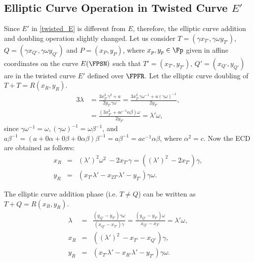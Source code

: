 \subsection{Elliptic Curve Operation in Twisted Curve $E'$}
 Since $E'$ in \eqref{twisted_E} is different from $E$, therefore, the elliptic curve addition and doubling operation slightly changed.
Let us consider  $T=(\gamma x_{T'},\gamma \omega y_{T'})$, $Q=(\gamma x_{Q'}, \gamma \omega y_{Q'})$  and  $P=(x_P,y_P) $, where $x_p, y_p \in \Fp$ given in affine coordinates on the curve $E(\FPSN)$ such that $T'=(x_{T'},y_{T'})$, $Q'=(x_{Q'},y_{Q'})$ are in the twisted curve $E'$ defined over $\FPFR$.
Let the elliptic curve doubling of $T+T = R(x_R, y_R)$. 
\begin{alignat}{3}
 \lambda & =  \frac{ 3x_{T'}^2 \gamma^2+a}{2 y_{T'} \gamma \omega} = \frac{ 3x_{T'}^2 \gamma \omega^{-1}+a (\gamma \omega)^{-1} }{2 y_{T'}}, \nonumber \\
 & = \frac{ (3x_{T'}^2 +a c^{-1} \alpha\beta)\omega}{2 y_{T'}} = \lambda' \omega, \nonumber 
 \end{alignat}
since  $\gamma \omega^{-1} = \omega, (\gamma \omega)^{-1} = \omega \beta^{-1}$, and $a \beta^{-1} = (a + 0\alpha + 0 \beta + 0 \alpha \beta) \beta ^{-1}=a \beta^{-1} = ac^{-1} \alpha \beta$, where $\alpha^2=c$.
Now the ECD are obtained as follows:
\begin{eqnarray}
 x_R &=& (\lambda')^2 \omega^2 \ - 2x_{T'}\gamma   = ((\lambda')^2  \ - 2x_{T'})\gamma, \nonumber \\
 y_R &=& (x_{T'}\lambda' -x_{2T'}\lambda'-y_{T'})\gamma \omega \nonumber.
\end{eqnarray}

The elliptic curve addition phase (i.e. $T\neq Q$) can be written as $T+Q = R(x_R, y_R)$.
\begin{eqnarray}
\lambda &=& \frac{( y_{Q'}-y_{T'})\gamma \omega}{( x_{Q'}-x_{T'})\gamma} = \frac{( y_{Q'}-y_{T'}) \omega}{x_{Q'}-x_{T'}} = \lambda' \omega, \nonumber\\
x_{R} & = & ((\lambda')^2  \ - x_{T'} -x_{Q'})\gamma, \nonumber \\
 y_{R} & = &  (x_{T'}\lambda' -x_{R'}\lambda'-y_{T'})\gamma \omega \nonumber.
\end{eqnarray}
